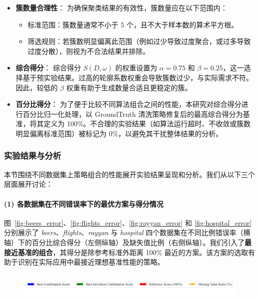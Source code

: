 \documentclass[10pt]{article} %
\numberwithin{equation}{section}
\begin{document}
\begin{itemize}
    \item \textbf{簇数量合理性}：  
    为确保聚类结果的有效性，簇数量应在以下范围内：  
    \begin{itemize}
        \item 标准范围：簇数量通常不小于 5 个，且不大于样本数的算术平方根。
        \item 筛选规则：若簇数明显偏离此范围（例如过少导致过度聚合，或过多导致过度分散），则视为不合法结果并排除。
    \end{itemize}
    
    \item \textbf{综合得分}：  
    综合得分 \(S(D,\omega)\) 的权重设置为 \(\alpha = 0.75\) 和 \(\beta = 0.25\)，这一选择基于预实验结果。过高的轮廓系数权重会导致簇数过少，与实际需求不符。因此，较低的 \(\beta\) 权重有助于生成数量合适且更稳定的簇。

    \item \textbf{百分比得分}：  
    为了便于比较不同算法组合之间的性能，本研究对综合得分进行百分比归一化处理，以 GroundTruth 清洗策略修复后的最高综合得分为基准，将其定义为 100\%。不合理的实验结果（如算法运行超时、不收敛或簇数明显偏离标准范围）被标记为 0\%，以避免其干扰整体结果的分析。

\end{itemize}

\subsubsection{实验结果与分析}
\label{sec:exp_result_all}
本节围绕不同数据集上策略组合的性能展开实验结果呈现和分析。我们从以下三个层面展开讨论：
\paragraph{(1) 各数据集在不同错误率下的最优方案与得分情况}  
图~\ref{fig:beers_error}、\ref{fig:flights_error}、\ref{fig:rayyan_error} 和 \ref{fig:hospital_error} 分别展示了 \textit{beers}、\textit{flights}、\textit{rayyan} 与 \textit{hospital} 四个数据集在不同比例错误率（横轴）下的百分比综合得分（左侧纵轴）及缺失值比例（右侧纵轴）。我们引入了\textbf{最接近基准的组合}，其得分是除参考标准外距离 100\% 最近的方案。该方案的选取有助于识别在实际应用中最接近理想基准性能的策略。

\begin{figure}[H]
    \centering
    \includegraphics[width=0.9\linewidth]{figures/legend_plot.png} %
    \vspace{-14pt} %
\end{figure}
\end{document}
